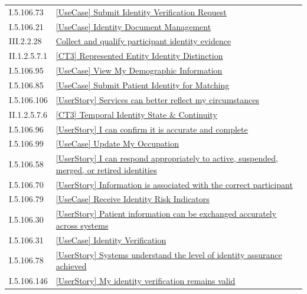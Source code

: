 \begin{longtable}{p{.22\linewidth}p{.73\linewidth}}
I.5.106.73 & \hyperref[element:cefccab04cf5426798617045a5e4192b]{[UseCase] Submit Identity Verification Request} \\
I.5.106.21 & \hyperref[element:cf34c96b80f643d2aed500946e6a83f2]{[UseCase] Identity Document Management} \\
III.2.2.28 & \hyperref[element:d3db9d9c27394b99bab78a34b395316a]{Collect and qualify participant identity evidence} \\
II.1.2.5.7.1 & \hyperref[element:d403533b88f243d0aa555a3a7566b5d1]{[CT3] Represented Entity Identity Distinction} \\
I.5.106.95 & \hyperref[element:d53eb0a939fc4e678e494b232d319097]{[UseCase] View My Demographic Information} \\
I.5.106.85 & \hyperref[element:d71c27182b53442fb47290d7981ec37d]{[UseCase] Submit Patient Identity for Matching} \\
I.5.106.106 & \hyperref[element:d7a8b6bbbe1a41e0b008c96e1c1af9fe]{[UserStory] Services can better reflect my circumstances} \\
II.1.2.5.7.6 & \hyperref[element:dae537d7b2f94d1596036ba891cab10d]{[CT3] Temporal Identity State \& Continuity} \\
I.5.106.96 & \hyperref[element:db3a39ec26a84f48943161f718b74755]{[UserStory] I can confirm it is accurate and complete} \\
I.5.106.99 & \hyperref[element:db5ad9f26ab94e51a7069558e03902ed]{[UseCase] Update My Occupation} \\
I.5.106.58 & \hyperref[element:dbbf0fb753e7464281d26ee1594aeb06]{[UserStory] I can respond appropriately to active, suspended, merged, or retired identities} \\
I.5.106.70 & \hyperref[element:dc8c04c5720744a4ac97b79603b56a86]{[UserStory] Information is associated with the correct participant} \\
I.5.106.79 & \hyperref[element:df7a868c530c4f5ba0b3be6f92626810]{[UseCase] Receive Identity Risk Indicators} \\
I.5.106.30 & \hyperref[element:e0b87bd871f24f63bd9d7dd282c95a28]{[UserStory] Patient information can be exchanged accurately across systems} \\
I.5.106.31 & \hyperref[element:e3630cbe1faa4850b17b57de1ddfa1e9]{[UseCase] Identity Verification} \\
I.5.106.78 & \hyperref[element:e4d8b2d3244b4e4f8dea1690e5f9abe0]{[UserStory] Systems understand the level of identity assurance achieved} \\
I.5.106.146 & \hyperref[element:e59f9df9b06c4543a09491ae5de7403c]{[UserStory] My identity verification remains valid} \\

\end{longtable}
